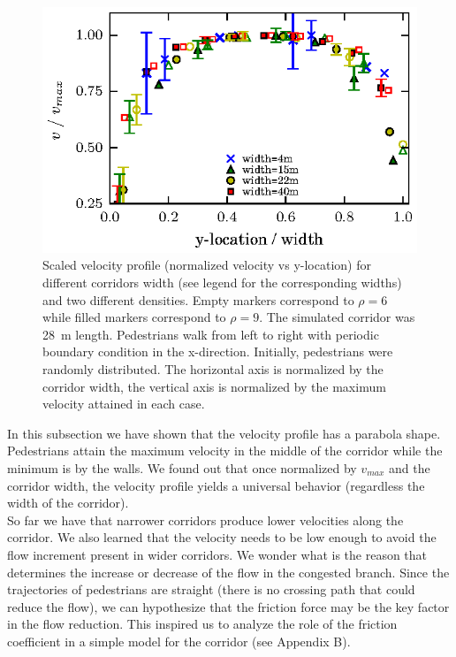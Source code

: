 \begin{figure}[htbp!]
\includegraphics[width=\columnwidth]
{plots/v(y)_multi_width_normaliz.eps}
\caption{\label{speed-profile-width-normaliz} Scaled velocity profile (normalized velocity vs y-location) for different corridors width (see legend for the corresponding widths) and two different densities. Empty markers correspond to $\rho=6$ while filled markers correspond to  $\rho=9$. The simulated corridor was 28~m length. Pedestrians walk from left to right with periodic boundary condition in the x-direction. Initially, pedestrians were randomly distributed. The horizontal axis is normalized by the corridor width, the vertical axis is normalized by the maximum velocity attained in each case.}
\end{figure}

In this subsection we have shown that the velocity profile has a parabola shape. Pedestrians attain the maximum velocity in the middle of the corridor while the minimum is by the walls. We found out that once normalized by $v_{max}$ and the corridor width, the velocity profile yields a universal behavior (regardless the width of the corridor).\\

So far we have that narrower corridors produce lower velocities along the corridor. We also learned that the velocity needs to be low enough to avoid the flow increment present in wider corridors. We wonder what is the reason that determines the
increase or decrease of the flow in the congested branch. Since the trajectories of pedestrians are straight (there
is no crossing path that could reduce the flow), we can hypothesize that the friction force may be the key factor in the
flow reduction. This inspired us to analyze the role of the friction coefficient in a simple model for
the corridor (see Appendix B). 

